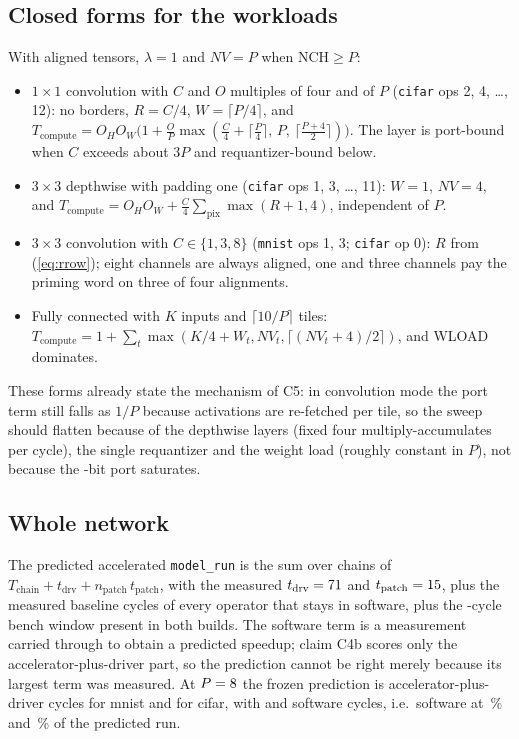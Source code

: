 \documentclass[journal]{IEEEtran}
\begin{document}
\subsection{Closed forms for the workloads}
With aligned tensors, $\lambda=1$ and $NV=P$ when $\mathrm{NCH}\ge P$:
\begin{itemize}\setlength{\itemsep}{1pt}
\item $1\times1$ convolution with $C$ and $O$ multiples of four and of $P$ (\texttt{cifar} ops 2, 4, \dots, 12): no borders, $R=C/4$, $W=\lceil P/4\rceil$, and
$T_{\mathrm{compute}} = O_HO_W\bigl(1 + \tfrac{O}{P}\max(\tfrac{C}{4}+\lceil\tfrac{P}{4}\rceil,\,P,\,\lceil\tfrac{P+4}{2}\rceil)\bigr)$. The layer is port-bound when $C$ exceeds about $3P$ and requantizer-bound below.
\item $3\times3$ depthwise with padding one (\texttt{cifar} ops 1, 3, \dots, 11): $W=1$, $NV=4$, and $T_{\mathrm{compute}} = O_HO_W + \tfrac{C}{4}\sum_{\mathrm{pix}}\max(R+1,4)$, independent of $P$.
\item $3\times3$ convolution with $C\in\{1,3,8\}$ (\texttt{mnist} ops 1, 3; \texttt{cifar} op 0): $R$ from (\ref{eq:rrow}); eight channels are always aligned, one and three channels pay the priming word on three of four alignments.
\item Fully connected with $K$ inputs and $\lceil 10/P\rceil$ tiles: $T_{\mathrm{compute}} = 1 + \sum_t \max(K/4 + W_t, NV_t, \lceil (NV_t+4)/2\rceil)$, and WLOAD dominates.
\end{itemize}
These forms already state the mechanism of C5: in convolution mode the port term still falls as $1/P$ because activations are re-fetched per tile, so the sweep should flatten because of the depthwise layers (fixed four multiply-accumulates per cycle), the single requantizer and the weight load (roughly constant in $P$), not because the \PortBits-bit port saturates.

\subsection{Whole network}
The predicted accelerated \texttt{model\_run} is the sum over chains of $T_{\mathrm{chain}} + t_{\mathrm{drv}} + n_{\mathrm{patch}}\,t_{\mathrm{patch}}$, with the measured $t_{\mathrm{drv}}=71$ and $t_{\mathrm{patch}}=15$, plus the measured baseline cycles of every operator that stays in software, plus the \BenchWindow-cycle bench window present in both builds. The software term is a measurement carried through to obtain a predicted speedup; claim C4b scores only the accelerator-plus-driver part, so the prediction cannot be right merely because its largest term was measured. At $P=8$ the frozen prediction is \PredCfourBMnistPeight{} accelerator-plus-driver cycles for mnist and \PredCfourBCifarPeight{} for cifar, with \PredSwCyclesMnistPeight{} and \PredSwCyclesCifarPeight{} software cycles, i.e.\ software at \PredSwShareMnistPeight\,\% and \PredSwShareCifarPeight\,\% of the predicted run.
\end{document}
